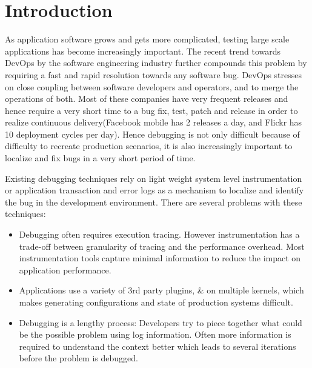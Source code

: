
\section{Introduction}
\label{sec:intro}

As application software grows and gets more complicated, testing large scale applications has become increasingly important. 
The recent trend towards DevOps\cite{devops} by the software engineering industry further compounds this problem by requiring a fast and rapid resolution towards any software bug.
DevOps stresses on close coupling between software developers and operators, and to merge the operations of both. 
Most of these companies have very frequent releases and hence require a very short time to a bug fix, test, patch and release in order to realize continuous delivery(Facebook mobile has 2 releases a day, and Flickr has 10 deployment cycles per day).
Hence debugging is not only difficult because of difficulty to recreate production scenarios, it is also increasingly important to localize and fix bugs in a very short period of time.

Existing debugging techniques\cite{clue,magpie,vPath} rely on light weight system level instrumentation or application transaction and error logs as a mechanism to localize and identify the bug in the development environment.
There are several problems with these techniques:
\begin{itemize}[leftmargin=*,topsep=0pt,itemsep=-1ex,partopsep=1ex,parsep=1ex]
\item Debugging often requires execution tracing. However instrumentation has a trade-off between granularity of tracing and the performance overhead. Most instrumentation tools capture minimal information to reduce the impact on application performance.
\item Applications use a variety of 3rd party plugins, \& on multiple kernels, which makes generating configurations and state of production systems difficult. 
\item Debugging is a lengthy process: Developers try to piece together what could be the possible problem using log information.
Often more information is required to understand the context better which leads to several iterations before the problem is debugged.
\end{itemize}

